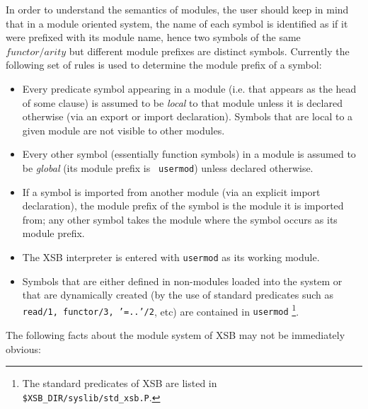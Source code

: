 In order to understand the semantics of modules, the user should keep in
mind that in a module oriented system, the name of each symbol is identified
as if it were prefixed with its module name, hence two symbols of the same
$functor/arity$ but different module prefixes are distinct symbols.  
Currently the following set of rules is used to determine the module 
prefix of a symbol:
\begin{itemize}
\item	Every predicate symbol appearing in a module (i.e. that appears as
	the head of some clause) is assumed to be {\em local} to that
	module unless it is declared otherwise (via an export or
	import declaration).  Symbols that are local to a given module
	are not visible to other modules.
\item	Every other symbol (essentially function symbols) in a module is
	assumed to be {\em global} (its module prefix is {\tt
	usermod}) unless declared otherwise.
\item	If a symbol is imported from another module (via an explicit import 
	declaration), the module prefix of the symbol is the module it is 
	imported from; any other symbol takes the module where the symbol 
	occurs as its module prefix.
\item	The XSB interpreter is entered with {\tt usermod} as its 
	working module.
\item	Symbols that are either defined in non-modules loaded into the
	system or that are dynamically created (by the use of standard
	predicates such as {\tt read/1, functor/3, '=..'/2}, etc) are
	contained in {\tt usermod}%
\footnote{The standard predicates of XSB are listed in {\tt
\$XSB\_DIR/syslib/std\_xsb.P}.}.  
\end{itemize}
%
The following facts about the module system of XSB may not be
immediately obvious:
